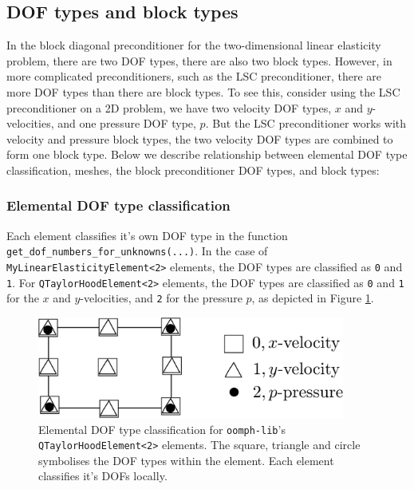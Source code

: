 \subsection{DOF types and block types\label{sec:dof_types_and_block_types}}
In the block diagonal preconditioner for the two-dimensional linear elasticity 
problem, there are two DOF types, there are also two block types. However, in 
more complicated preconditioners, such as the LSC preconditioner, there are 
more DOF types than there are block types. To see this, consider  using the 
LSC preconditioner on a 2D problem, we have two velocity DOF types, $x$ and 
$y$-velocities, and one pressure DOF type, $p$. But the LSC preconditioner 
works with velocity and pressure block types, the two velocity DOF types are 
combined to form one block type. Below we describe relationship between 
elemental DOF type classification, meshes, the block preconditioner DOF types, 
and block types:


\subsubsection{Elemental DOF type classification}

Each element classifies it's own DOF type in the function 
\texttt{get\_\allowbreak dof\_\allowbreak numbers\_\allowbreak for\_\allowbreak unknowns(...)}. In the case of 
\texttt{My\allowbreak Linear\allowbreak Elasticity\allowbreak Element<2>} elements, the DOF types are classified as 
\texttt{0} and \texttt{1}. For \texttt{Q\allowbreak TaylorHood\allowbreak Element<2>} 
elements, the DOF types are classified as \texttt{0} and \texttt{1} for the $x$
and $y$-velocities, and \texttt{2} for the pressure $p$, as depicted in Figure \ref{fig:2DTH_DOF_classification}.
\begin{figure}[H]
\centering
\includegraphics[width=0.9\textwidth]{./pic/taylorhood_dof_classification.pdf}
\caption{Elemental DOF type classification for \texttt{oomph-\allowbreak lib}'s
  \texttt{Q\allowbreak TaylorHood\allowbreak Element<2>} elements. The square,
  triangle and circle symbolises the DOF types within the element. Each element
  classifies it's DOFs locally.}
\label{fig:2DTH_DOF_classification}
\end{figure}

